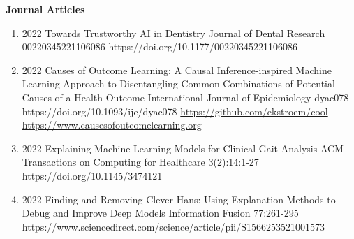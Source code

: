 \documentclass[10pt,a4paper]{article} %
\begin{document}
\headedsection %
{\bf Journal Articles}{ }
{
\begin{enumerate}

    \item {}
                        {2022}
                        {Towards Trustworthy AI in Dentistry}
                        {Journal of Dental Research}
                        {00220345221106086}
                        {https://doi.org/10.1177/00220345221106086}


    \item {}
                        {2022}
                        {Causes of Outcome Learning: A Causal Inference-inspired Machine Learning Approach to Disentangling Common Combinations of Potential Causes of a Health Outcome}
                        {International Journal of Epidemiology}
                        {dyac078}
                        {https://doi.org/10.1093/ije/dyac078}
                        {\href{https://github.com/ekstroem/cool}{https://github.com/ekstroem/cool}\\
                         \href{https://www.causesofoutcomelearning.org}{https://www.causesofoutcomelearning.org}
                        }

    \item {}
                        {2022}
                        {Explaining Machine Learning Models for Clinical Gait Analysis}
                        {ACM Transactions on Computing for Healthcare}
                        {3(2):14:1-27}
                        {https://doi.org/10.1145/3474121}


    \item {}
                        {2022}
                        {Finding and Removing Clever Hans: Using Explanation Methods to Debug and Improve Deep Models}
                        {Information Fusion}
                        {77:261-295}
                        {https://www.sciencedirect.com/science/article/pii/S1566253521001573}



\end{enumerate}}
\end{document}
